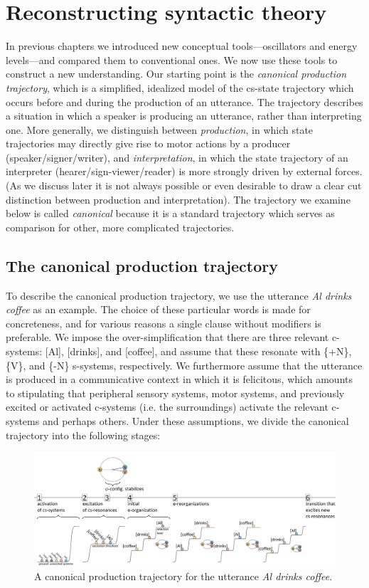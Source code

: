 \chapter{Reconstructing syntactic theory}

In previous chapters we introduced new conceptual tools—oscillators and energy levels—and compared them to conventional ones. We now use these tools to construct a new understanding. Our starting point is the \textit{canonical production trajectory}, which is a simplified, idealized model of the cs-state trajectory which occurs before and during the production of an utterance. The trajectory describes a situation in which a speaker is producing an utterance, rather than interpreting one. More generally, we distinguish between \textit{production}, in which state trajectories may directly give rise to motor actions by a producer (speaker/signer/writer), and \textit{interpretation}, in which the state trajectory of an interpreter (hearer/sign-viewer/reader) is more strongly driven by external forces. (As we discuss later it is not always possible or even desirable to draw a clear cut distinction between production and interpretation). The trajectory we examine below is called \textit{canonical} because it is a standard trajectory which serves as comparison for other, more complicated trajectories.

\section{The canonical production trajectory}

To describe the canonical production trajectory, we use the utterance \textit{Al drinks coffee} as an example. The choice of these particular words is made for concreteness, and for various reasons a single clause without modifiers is preferable. We impose the over-simplification that there are three relevant c-systems: [Al], [drinks], and [coffee], and assume that these resonate with \{+N\}, \{V\}, and \{-N\} s-systems, respectively. We furthermore assume that the utterance is produced in a communicative context in which it is felicitous, which amounts to stipulating that peripheral sensory systems, motor systems, and previously excited or activated c-systems (i.e. the surroundings) activate the relevant c-systems and perhaps others. Under these assumptions, we divide the canonical trajectory into the following stages:

  
\begin{figure}
\includegraphics[width=\textwidth]{figures/Tilsen-img51.png}
\caption{A canonical production trajectory for the utterance \textit{Al drinks coffee}.}
\label{fig:4:1}
\end{figure}
 

